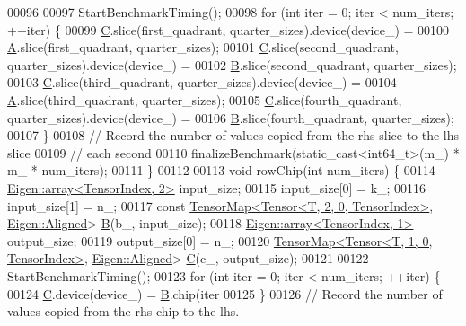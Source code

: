 \begin{DoxyCode}
00096 
00097     StartBenchmarkTiming();
00098     \textcolor{keywordflow}{for} (\textcolor{keywordtype}{int} iter = 0; iter < num\_iters; ++iter) \{
00099       \hyperlink{group___core___module}{C}.slice(first\_quadrant, quarter\_sizes).device(device\_) =
00100           \hyperlink{group___core___module_class_eigen_1_1_matrix}{A}.slice(first\_quadrant, quarter\_sizes);
00101       \hyperlink{group___core___module}{C}.slice(second\_quadrant, quarter\_sizes).device(device\_) =
00102           \hyperlink{group___core___module_class_eigen_1_1_matrix}{B}.slice(second\_quadrant, quarter\_sizes);
00103       \hyperlink{group___core___module}{C}.slice(third\_quadrant, quarter\_sizes).device(device\_) =
00104           \hyperlink{group___core___module_class_eigen_1_1_matrix}{A}.slice(third\_quadrant, quarter\_sizes);
00105       \hyperlink{group___core___module}{C}.slice(fourth\_quadrant, quarter\_sizes).device(device\_) =
00106           \hyperlink{group___core___module_class_eigen_1_1_matrix}{B}.slice(fourth\_quadrant, quarter\_sizes);
00107     \}
00108     \textcolor{comment}{// Record the number of values copied from the rhs slice to the lhs slice}
00109     \textcolor{comment}{// each second}
00110     finalizeBenchmark(static\_cast<int64\_t>(m\_) * m\_ * num\_iters);
00111   \}
00112 
00113   \textcolor{keywordtype}{void} rowChip(\textcolor{keywordtype}{int} num\_iters) \{
00114     \hyperlink{class_eigen_1_1array}{Eigen::array<TensorIndex, 2>} input\_size;
00115     input\_size[0] = k\_;
00116     input\_size[1] = n\_;
00117     \textcolor{keyword}{const} \hyperlink{class_eigen_1_1_tensor_map}{TensorMap<Tensor<T, 2, 0, TensorIndex>}, 
      \hyperlink{group__enums_gga45fe06e29902b7a2773de05ba27b47a1ad37d4c71425bb286e9b4103830538fbf}{Eigen::Aligned}> \hyperlink{group___core___module_class_eigen_1_1_matrix}{B}(b\_, input\_size);
00118     \hyperlink{class_eigen_1_1array}{Eigen::array<TensorIndex, 1>} output\_size;
00119     output\_size[0] = n\_;
00120     \hyperlink{class_eigen_1_1_tensor_map}{TensorMap<Tensor<T, 1, 0, TensorIndex>}, 
      \hyperlink{group__enums_gga45fe06e29902b7a2773de05ba27b47a1ad37d4c71425bb286e9b4103830538fbf}{Eigen::Aligned}> \hyperlink{group___core___module}{C}(c\_, output\_size);
00121 
00122     StartBenchmarkTiming();
00123     \textcolor{keywordflow}{for} (\textcolor{keywordtype}{int} iter = 0; iter < num\_iters; ++iter) \{
00124       \hyperlink{group___core___module}{C}.device(device\_) = \hyperlink{group___core___module_class_eigen_1_1_matrix}{B}.chip(iter %
00125     \}
00126     \textcolor{comment}{// Record the number of values copied from the rhs chip to the lhs.}

\end{DoxyCode}
